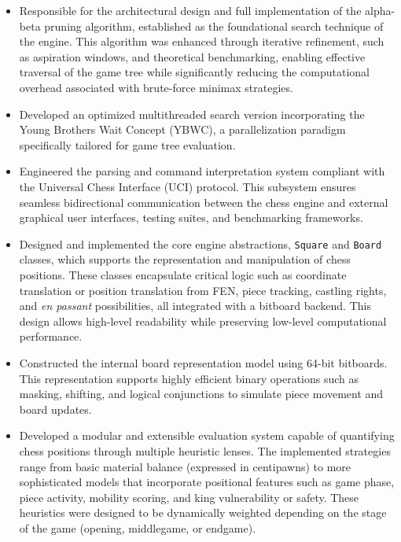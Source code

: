 \begin{itemize}
    \item Responsible for the architectural design and full implementation of the alpha-beta pruning algorithm, established as the foundational search technique of the engine. This algorithm was enhanced through iterative refinement, such as aspiration windows, and theoretical benchmarking, enabling effective traversal of the game tree while significantly reducing the computational overhead associated with brute-force minimax strategies.

    \item Developed an optimized multithreaded search version incorporating the Young Brothers Wait Concept (YBWC), a parallelization paradigm specifically tailored for game tree evaluation.

    \item Engineered the parsing and command interpretation system compliant with the Universal Chess Interface (UCI) protocol. This subsystem ensures seamless bidirectional communication between the chess engine and external graphical user interfaces, testing suites, and benchmarking frameworks.

    \item Designed and implemented the core engine abstractions, \texttt{Square} and \texttt{Board} classes, which supports the representation and manipulation of chess positions. These classes encapsulate critical logic such as coordinate translation or position translation from FEN, piece tracking, castling rights, and \textit{en passant} possibilities, all integrated with a bitboard backend. This design allows high-level readability while preserving low-level computational performance.

    \item Constructed the internal board representation model using 64-bit bitboards. This representation supports highly efficient binary operations such as masking, shifting, and logical conjunctions to simulate piece movement and board updates.

    \item Developed a modular and extensible evaluation system capable of quantifying chess positions through multiple heuristic lenses. The implemented strategies range from basic material balance (expressed in centipawns) to more sophisticated models that incorporate positional features such as game phase, piece activity, mobility scoring, and king vulnerability or safety. These heuristics were designed to be dynamically weighted depending on the stage of the game (opening, middlegame, or endgame).


\end{itemize}
